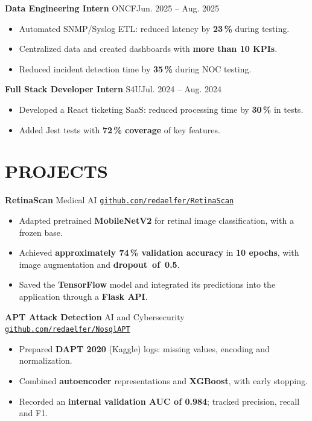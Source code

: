 \documentclass[11pt,a4paper]{article}
\newcommand{\entry}[2]{\noindent #1\hfill #2\par}
\newcommand{\jobgap}{\vspace{5pt}}
\begin{document}
\jobgap
\entry{\textbf{Data Engineering Intern} \textbar{} ONCF}{Jun. 2025 -- Aug. 2025}
\begin{itemize}
  \item Automated SNMP/Syslog ETL: reduced latency by \textbf{23\,\%} during testing.
  \item Centralized data and created dashboards with \textbf{more than 10 KPIs}.
  \item Reduced incident detection time by \textbf{35\,\%} during NOC testing.
\end{itemize}

\jobgap
\entry{\textbf{Full Stack Developer Intern} \textbar{} S4U}{Jul. 2024 -- Aug. 2024}
\begin{itemize}
  \item Developed a React ticketing SaaS: reduced processing time by \textbf{30\,\%} in tests.
  \item Added Jest tests with \textbf{72\,\% coverage} of key features.
\end{itemize}

\section*{PROJECTS}

\textbf{RetinaScan} \textbar{} Medical AI \textbar{} \href{https://github.com/redaelfer/RetinaScan}{\nolinkurl{github.com/redaelfer/RetinaScan}}\par
\begin{itemize}
  \item Adapted pretrained \textbf{MobileNetV2} for retinal image classification, with a frozen base.
  \item Achieved \textbf{approximately 74\,\% validation accuracy} in \textbf{10 epochs}, with image augmentation and \textbf{dropout~of~0.5}.
  \item Saved the \textbf{TensorFlow} model and integrated its predictions into the application through a \textbf{Flask API}.
\end{itemize}

\jobgap
\textbf{APT Attack Detection} \textbar{} AI and Cybersecurity \textbar{} \href{https://github.com/redaelfer/NosqlAPT}{\nolinkurl{github.com/redaelfer/NosqlAPT}}\par
\begin{itemize}
  \item Prepared \textbf{DAPT 2020} (Kaggle) logs: missing values, encoding and normalization.
  \item Combined \textbf{autoencoder} representations and \textbf{XGBoost}, with early stopping.
  \item Recorded an \textbf{internal validation AUC of 0.984}; tracked precision, recall and F1.
\end{itemize}
\end{document}
